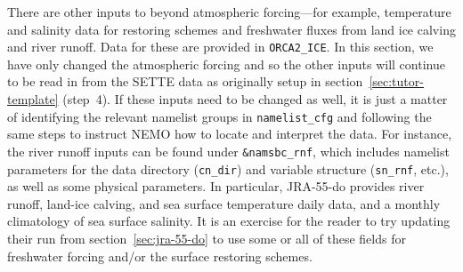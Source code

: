 There are other inputs to \NEMOSIcu{} beyond atmospheric forcing---for example, temperature and salinity data for restoring schemes and freshwater fluxes from land ice calving and river runoff.
Data for these are provided in \verb|ORCA2_ICE|.
In this section, we have only changed the atmospheric forcing and so the other inputs will continue to be read in from the SETTE data as originally setup in section~\ref{sec:tutor-template} (step~4).
If these inputs need to be changed as well, it is just a matter of identifying the relevant namelist groups in \verb|namelist_cfg| and following the same steps to instruct NEMO how to locate and interpret the data.
For instance, the river runoff inputs can be found under \verb|&namsbc_rnf|, which includes namelist parameters for the data directory (\verb|cn_dir|) and variable structure (\verb|sn_rnf|, etc.), as well as some physical parameters.
In particular, \mbox{JRA-55-do} provides river runoff, land-ice calving, and sea surface temperature daily data, and a monthly climatology of sea surface salinity.
It is an exercise for the reader to try updating their run from section~\ref{sec:jra-55-do} to use some or all of these fields for freshwater forcing and/or the surface restoring schemes.

